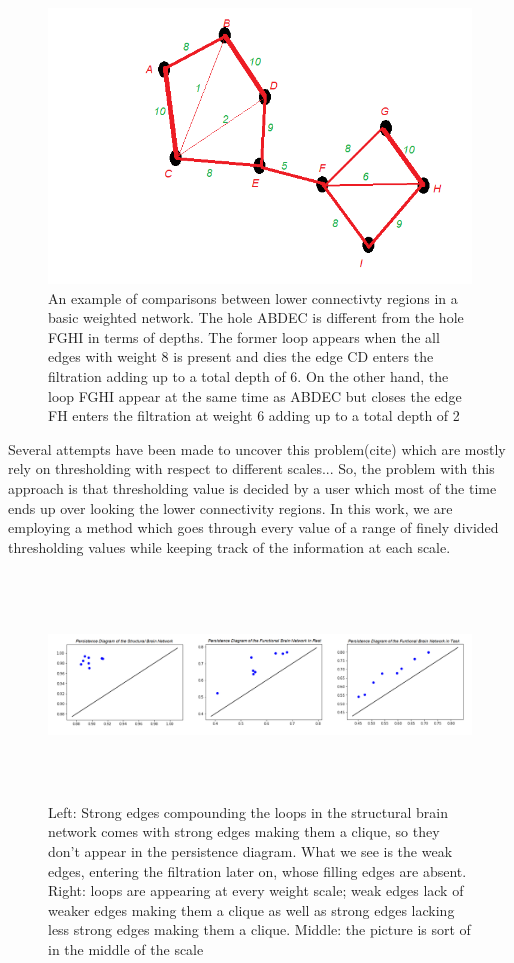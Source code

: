 \documentclass[9pt,twocolumn,twoside,lineno]{pnas-new}
\begin{document}
\begin{figure}%
\centering
\includegraphics[width=.8\linewidth]{lower_connectivity.png}
\caption{An example of comparisons between lower connectivty regions in a basic weighted network. The hole ABDEC is different from the hole FGHI in terms of depths. The former  loop appears when the all edges with weight 8 is present and dies the edge CD enters the filtration adding up to a total depth of 6. On the other hand, the loop FGHI appear at the same time as ABDEC but closes the edge FH enters the filtration at weight 6 adding up to a total depth of 2}
\label{fig:connectivty}
\end{figure}

Several attempts have been made to uncover this problem(cite) which are mostly rely on thresholding with respect to different scales... So, the problem with this approach is that thresholding value is decided by a user which most of the time ends up over looking the lower connectivity regions. In this work, we are employing a method which goes through every value of a range of finely divided thresholding values while keeping track of the information at each scale. 
\begin{figure}%
\centering
\includegraphics[width=18cm,height=6cm]{peristencediagrams.png}
\caption{Left: Strong edges compounding the loops in the structural brain network comes with strong edges making them a clique, so they don't appear in the persistence diagram. What we see is the weak edges, entering the filtration later on, whose filling edges are absent. Right: loops are appearing at every weight scale; weak edges lack of weaker edges making them a clique as well as strong edges lacking less strong edges making them a clique. Middle: the picture is sort of in the middle of the scale}
\end{figure}
\end{document}
